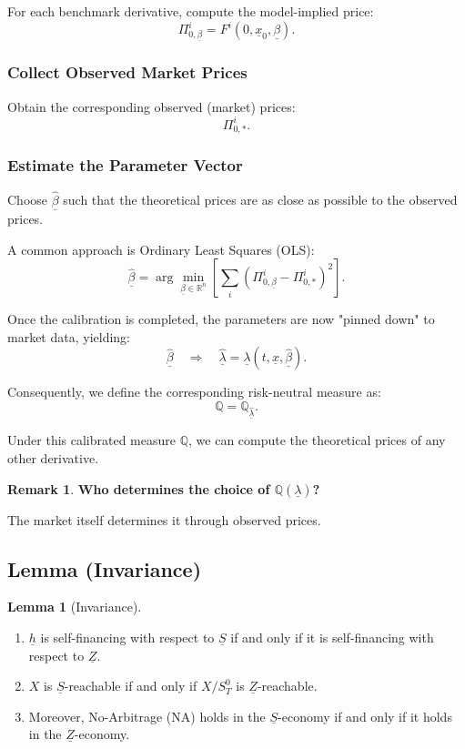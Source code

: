 \documentclass[12pt,a4paper]{article}
\theoremstyle{definition}
\newtheorem{lemma}{Lemma}[section]
\newtheorem{remark}{Remark}[section]
\newcommand{\R}{\mathbb{R}}
\begin{document}
For each benchmark derivative, compute the model-implied price:
\[
\Pi_{0,\underline{\beta}}^i = F^i(0, \underline{x}_0, \underline{\beta}).
\]

\subsubsection{Collect Observed Market Prices}

Obtain the corresponding observed (market) prices:
\[
\Pi_{0,*}^i.
\]

\subsubsection{Estimate the Parameter Vector}

Choose $\hat{\underline{\beta}}$ such that the theoretical prices are as close as possible to the observed prices.

A common approach is Ordinary Least Squares (OLS):
\[
\hat{\underline{\beta}} = \arg\min_{\underline{\beta} \in \R^n} \left[\sum_i (\Pi_{0,\underline{\beta}}^i - \Pi_{0,*}^i)^2\right].
\]

Once the calibration is completed, the parameters are now "pinned down" to market data, yielding:
\[
\hat{\underline{\beta}} \quad \Rightarrow \quad \hat{\underline{\lambda}} = \underline{\lambda}(t, \underline{x}, \hat{\underline{\beta}}).
\]

Consequently, we define the corresponding risk-neutral measure as:
\[
\mathbb{Q} = \mathbb{Q}_{\hat{\underline{\lambda}}}.
\]

Under this calibrated measure $\mathbb{Q}$, we can compute the theoretical prices of any other derivative.

\begin{remark}
\textbf{Who determines the choice of $\mathbb{Q}(\underline{\lambda})$?}

The market itself determines it through observed prices.
\end{remark}

\subsection{Lemma (Invariance)}

\begin{lemma}[Invariance]
\begin{enumerate}
\item $\underline{h}$ is self-financing with respect to $\underline{S}$ if and only if it is self-financing with respect to $\underline{Z}$.

\item $X$ is $\underline{S}$-reachable if and only if $X / S_T^0$ is $\underline{Z}$-reachable.

\item Moreover, No-Arbitrage (NA) holds in the $\underline{S}$-economy if and only if it holds in the $\underline{Z}$-economy.
\end{enumerate}
\end{lemma}
\end{document}
